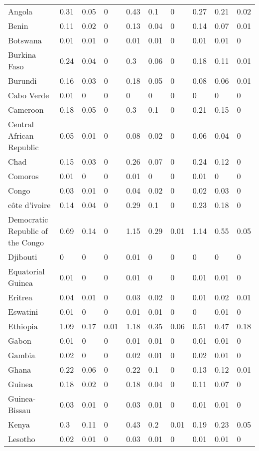 \begin{longtable}[t]{llllllllll}
Angola & 0.31 & 0.05 & 0 & 0.43 & 0.1 & 0 & 0.27 & 0.21 & 0.02\\
Benin & 0.11 & 0.02 & 0 & 0.13 & 0.04 & 0 & 0.14 & 0.07 & 0.01\\
Botswana & 0.01 & 0.01 & 0 & 0.01 & 0.01 & 0 & 0.01 & 0.01 & 0\\
Burkina Faso & 0.24 & 0.04 & 0 & 0.3 & 0.06 & 0 & 0.18 & 0.11 & 0.01\\
Burundi & 0.16 & 0.03 & 0 & 0.18 & 0.05 & 0 & 0.08 & 0.06 & 0.01\\
Cabo Verde & 0.01 & 0 & 0 & 0 & 0 & 0 & 0 & 0 & 0\\
Cameroon & 0.18 & 0.05 & 0 & 0.3 & 0.1 & 0 & 0.21 & 0.15 & 0\\
Central African Republic & 0.05 & 0.01 & 0 & 0.08 & 0.02 & 0 & 0.06 & 0.04 & 0\\
Chad & 0.15 & 0.03 & 0 & 0.26 & 0.07 & 0 & 0.24 & 0.12 & 0\\
Comoros & 0.01 & 0 & 0 & 0.01 & 0 & 0 & 0.01 & 0 & 0\\
Congo & 0.03 & 0.01 & 0 & 0.04 & 0.02 & 0 & 0.02 & 0.03 & 0\\
côte d'ivoire & 0.14 & 0.04 & 0 & 0.29 & 0.1 & 0 & 0.23 & 0.18 & 0\\
Democratic Republic of the Congo & 0.69 & 0.14 & 0 & 1.15 & 0.29 & 0.01 & 1.14 & 0.55 & 0.05\\
Djibouti & 0 & 0 & 0 & 0.01 & 0 & 0 & 0 & 0 & 0\\
Equatorial Guinea & 0.01 & 0 & 0 & 0.01 & 0 & 0 & 0.01 & 0.01 & 0\\
Eritrea & 0.04 & 0.01 & 0 & 0.03 & 0.02 & 0 & 0.01 & 0.02 & 0.01\\
Eswatini & 0.01 & 0 & 0 & 0.01 & 0.01 & 0 & 0 & 0.01 & 0\\
Ethiopia & 1.09 & 0.17 & 0.01 & 1.18 & 0.35 & 0.06 & 0.51 & 0.47 & 0.18\\
Gabon & 0.01 & 0 & 0 & 0.01 & 0.01 & 0 & 0.01 & 0.01 & 0\\
Gambia & 0.02 & 0 & 0 & 0.02 & 0.01 & 0 & 0.02 & 0.01 & 0\\
Ghana & 0.22 & 0.06 & 0 & 0.22 & 0.1 & 0 & 0.13 & 0.12 & 0.01\\
Guinea & 0.18 & 0.02 & 0 & 0.18 & 0.04 & 0 & 0.11 & 0.07 & 0\\
Guinea-Bissau & 0.03 & 0.01 & 0 & 0.03 & 0.01 & 0 & 0.01 & 0.01 & 0\\
Kenya & 0.3 & 0.11 & 0 & 0.43 & 0.2 & 0.01 & 0.19 & 0.23 & 0.05\\
Lesotho & 0.02 & 0.01 & 0 & 0.03 & 0.01 & 0 & 0.01 & 0.01 & 0\\

\end{longtable}
